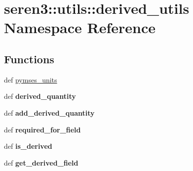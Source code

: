 \hypertarget{namespaceseren3_1_1utils_1_1derived__utils}{
\section{seren3::utils::derived\_\-utils Namespace Reference}
\label{namespaceseren3_1_1utils_1_1derived__utils}
}
\subsection*{Functions}
\begin{DoxyCompactItemize}
\item 
def \hyperlink{namespaceseren3_1_1utils_1_1derived__utils_afede29ea170bbbc6746a11c1cd758242}{pymses\_\-units}
\item 
\hypertarget{namespaceseren3_1_1utils_1_1derived__utils_a1eb1b99ea069175967d3f03bddf1cfde}{
def {\bfseries derived\_\-quantity}}
\label{namespaceseren3_1_1utils_1_1derived__utils_a1eb1b99ea069175967d3f03bddf1cfde}

\item 
\hypertarget{namespaceseren3_1_1utils_1_1derived__utils_a772507feebc28678cbdf87595f42a48c}{
def {\bfseries add\_\-derived\_\-quantity}}
\label{namespaceseren3_1_1utils_1_1derived__utils_a772507feebc28678cbdf87595f42a48c}

\item 
\hypertarget{namespaceseren3_1_1utils_1_1derived__utils_abccc696edc0d5919dd525cedb2cbcb42}{
def {\bfseries required\_\-for\_\-field}}
\label{namespaceseren3_1_1utils_1_1derived__utils_abccc696edc0d5919dd525cedb2cbcb42}

\item 
\hypertarget{namespaceseren3_1_1utils_1_1derived__utils_a7b27892a63541b13271d7afc7039f1a6}{
def {\bfseries is\_\-derived}}
\label{namespaceseren3_1_1utils_1_1derived__utils_a7b27892a63541b13271d7afc7039f1a6}

\item 
\hypertarget{namespaceseren3_1_1utils_1_1derived__utils_aca48180334a70e89267a098f16799543}{
def {\bfseries get\_\-derived\_\-field}}
\label{namespaceseren3_1_1utils_1_1derived__utils_aca48180334a70e89267a098f16799543}

\end{DoxyCompactItemize}
